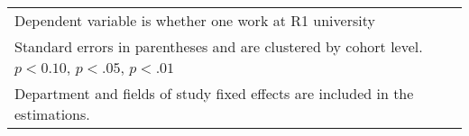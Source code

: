 \begin{table}[ht]
{\begin{tabular}{l*{6}{c}}
\hline\hline
\multicolumn{7}{l}{\footnotesize Dependent variable is whether one work at R1 university}\\
\multicolumn{7}{l}{\footnotesize Standard errors in parentheses and are clustered by cohort level. \sym{*} \(p<0.10\), \sym{**} \(p<.05\), \sym{***} \(p<.01\)}\\
\multicolumn{7}{l}{\footnotesize Department and fields of study fixed effects are included in the estimations.}\\
\end{tabular}%
}
\end{table}